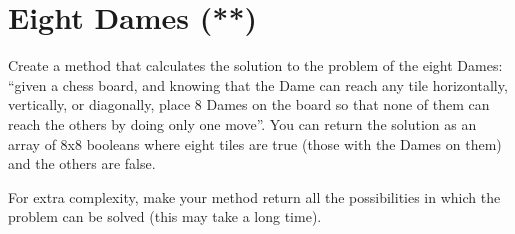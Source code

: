 \documentclass{article}
\begin{document}
\section{Eight Dames (**)}
\label{sec:eight-dames}

Create a method that calculates the solution to the problem of the
eight Dames: ``given a chess board, and knowing that the Dame can reach
any tile horizontally, vertically, or diagonally, place 8 Dames on the
board so that none of them can reach the others by doing only one
move''. You can return the solution as an array of 8x8 booleans where
eight tiles are true (those with the Dames on them) and the others are false. 

For extra complexity, make your method return all the possibilities in
which the problem can be solved (this may take a long time). 



%
%
\end{document}
